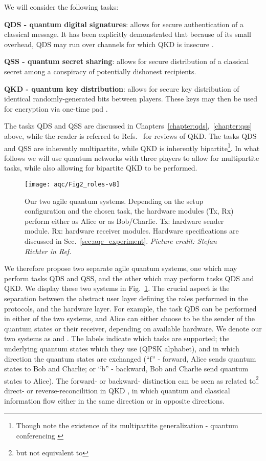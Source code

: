 We will consider the following tasks:

\textbf{QDS - quantum digital signatures}: allows for secure authentication of a classical message. It has been explicitly demonstrated that because of its small overhead, QDS may run over channels for which QKD is insecure \cite{Amiri2016}.

\textbf{QSS - quantum secret sharing}: allows for secure distribution of a classical secret among a conspiracy of potentially dishonest recipients.

\textbf{QKD - quantum key distribution}: allows for secure key distribution of identical randomly-generated bits between players. These keys may then be used for encryption via one-time pad \cite{Bennett1984, Schneier1996}.

The tasks QDS and QSS are discussed in Chapters~\ref{chapter:qds},~\ref{chapter:qss} above, while the reader is referred to Refs.~\cite{Laudenbach2017, Scarani2009} for reviews of QKD. The tasks QDS and QSS are inherently multipartite, while QKD is inherently bipartite\footnote{Though note the existence of its multipartite generalization - quantum conferencing \cite{Ottaviani2017b, Ottaviani2019}}. In what follows we will use quantum networks with three players to allow for multipartite tasks, while also allowing for bipartite QKD to be performed.

\begin{figure}[htp]
\captionsetup{width=\linewidth}
\centering
\texttt{[image: aqc/Fig2\_roles-v8]}
\caption{\label{fig:agile_tasks} Our two agile quantum systems. Depending on the setup configuration and the chosen task, the hardware modules (Tx, Rx) perform either as Alice or as Bob/Charlie. Tx: hardware sender module. Rx: hardware receiver modules. Hardware specifications are discussed in Sec.~\ref{sec:aqc_experiment}. \emph{Picture credit: Stefan Richter in Ref.~\cite{Richter2020}}}
\end{figure}

We therefore propose two separate agile quantum systems, one which may perform tasks QDS and QSS, and the other which may perform tasks QDS and QKD. We display these two systems in Fig.~\ref{fig:agile_tasks}. The crucial aspect is the separation between the abstract user layer defining the roles performed in the protocols, and the hardware layer. For example, the task QDS can be performed in either of the two systems, and Alice can either choose to be the sender of the quantum states or their receiver, depending on available hardware. We denote our two systems as \systemB \;and \systemF. The labels indicate which tasks are supported; the underlying quantum states which they use (QPSK alphabet), and in which direction the quantum states are exchanged (``f'' - forward, Alice sends quantum states to Bob and Charlie; or ``b'' - backward, Bob and Charlie send quantum states to Alice). The forward- or backward- distinction can be seen as related to\footnote{but not equivalent to} direct- or reverse-reconcilition in QKD \cite{Laudenbach2017}, in which quantum and classical information flow either in the same direction or in opposite directions.




